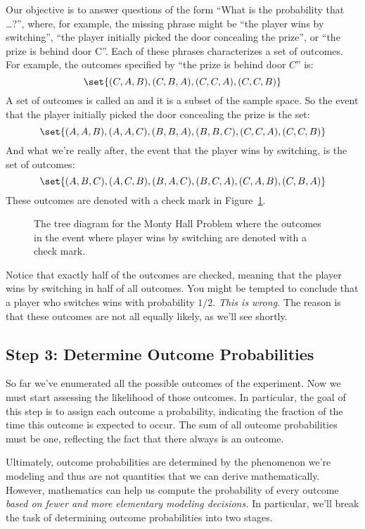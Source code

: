 Our objective is to answer questions of the form ``What is the
probability that \dots ?'', where, for example, the missing phrase
might be ``the player wins by switching'', ``the player initially
picked the door concealing the prize'', or ``the prize is behind door
C''.  Each of these phrases characterizes a set of outcomes. For
example, the outcomes specified by ``the prize is behind door $C$''
is:
%
\[
\set{(C, A, B), (C, B, A), (C, C, A), (C, C, B)}
\]
%
A set of outcomes is called an  and it is a subset of the
sample space.  So the event that the player initially picked the door
concealing the prize is the set:
%
\[
\set{(A, A, B), (A, A, C), (B, B, A), (B, B, C), (C, C, A), (C, C, B)}
\]
%
And what we're really after, the event that the player wins by
switching, is the set of outcomes:
%
\[
\set{(A, B, C), (A, C, B), (B, A, C), (B, C, A), (C, A, B), (C, B, A)}
\]
These outcomes are denoted with a check mark in Figure~\ref{fig:14A4}.

\begin{figure}


\caption{The tree diagram for the Monty Hall Problem where the
  outcomes in the event where player wins by switching are denoted
  with a check mark.}

\label{fig:14A4}

\end{figure}

Notice that exactly half of the outcomes are checked, meaning that the
player wins by switching in half of all outcomes.  You might be
tempted to conclude that a player who switches wins with probability
$1/2$.  \emph{This is wrong.}  The reason is that these outcomes are
not all equally likely, as we'll see shortly.

\subsection{Step 3: Determine Outcome Probabilities}

So far we've enumerated all the possible outcomes of the experiment.  Now
we must start assessing the likelihood of those outcomes.  In particular,
the goal of this step is to assign each outcome a probability, indicating
the fraction of the time this outcome is expected to occur.  The sum of
all outcome probabilities must be one, reflecting the fact that there
always is an outcome.

Ultimately, outcome probabilities are determined by the phenomenon
we're modeling and thus are not quantities that we can derive
mathematically.  However, mathematics can help us compute the
probability of every outcome \emph{based on fewer and more
elementary modeling decisions.}  In particular, we'll break the task
of determining outcome probabilities into two stages.

